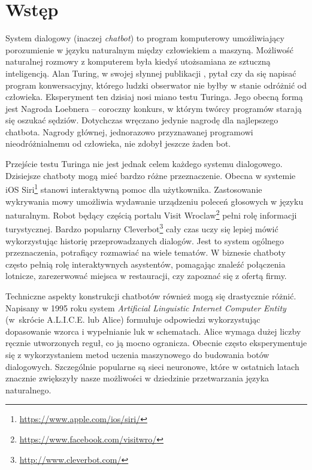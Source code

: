 
\setlength{\abovedisplayskip}{20pt}
\setlength{\belowdisplayskip}{20pt}

\chapter{Wstęp}

System dialogowy (inaczej \textit{chatbot}) to program komputerowy umożliwiający porozumienie w języku naturalnym między człowiekiem a maszyną. Możliwość naturalnej rozmowy z komputerem była kiedyś utożsamiana ze sztuczną inteligencją. Alan Turing, w swojej słynnej publikacji \cite{turing}, pytał czy da się napisać program konwersacyjny, którego ludzki obserwator nie byłby w stanie odróżnić od człowieka. Eksperyment ten dzisiaj nosi miano testu Turinga. Jego obecną formą jest Nagroda Loebnera -- coroczny konkurs, w którym twórcy programów starają się oszukać sędziów. Dotychczas wręczano jedynie nagrodę dla najlepszego chatbota. Nagrody głównej, jednorazowo przyznawanej programowi nieodróżnialnemu od człowieka, nie zdobył jeszcze żaden bot.

Przejście testu Turinga nie jest jednak celem każdego systemu dialogowego. Dzisiejsze chatboty mogą mieć bardzo różne przeznaczenie. Obecna w systemie iOS Siri\footnote{\url{https://www.apple.com/ios/siri/}} stanowi interaktywną pomoc dla użytkownika. Zastosowanie wykrywania mowy umożliwia wydawanie urządzeniu poleceń głosowych w języku naturalnym. Robot będący częścią portalu Visit Wroclaw\footnote{\url{https://www.facebook.com/visitwro/}} pełni rolę informacji turystycznej. Bardzo popularny Cleverbot\footnote{\url{http://www.cleverbot.com/}} cały czas uczy się lepiej mówić wykorzystując historię przeprowadzanych dialogów. Jest to system ogólnego przeznaczenia, potrafiący rozmawiać na wiele tematów. W biznesie chatboty często pełnią rolę interaktywnych asystentów, pomagając znaleźć połączenia lotnicze, zarezerwować miejsca w restauracji, czy zapoznać się z ofertą firmy.

Techniczne aspekty konstrukcji chatbotów również mogą się drastycznie różnić. Napisany w 1995 roku system \textit{Artificial Linguistic Internet Computer Entity} (w~skrócie A.L.I.C.E. lub Alice) \cite{alice} formułuje odpowiedzi wykorzystując dopasowanie wzorca i wypełnianie luk w schematach. Alice wymaga dużej liczby ręcznie utworzonych reguł, co ją mocno ogranicza. Obecnie często eksperymentuje się z wykorzystaniem metod uczenia maszynowego do budowania botów dialogowych. Szczególnie popularne są sieci neuronowe, które w ostatnich latach znacznie zwiększyły nasze możliwości w dziedzinie przetwarzania języka naturalnego.

